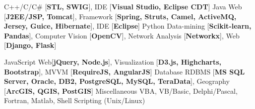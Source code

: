 \begin{cvskills}
    \cvskill
    {C++/C/C\#} %
    {[\textbf{STL, SWIG}], IDE [\textbf{Visual Studio, Eclipse CDT}]} 
    \cvskill
    {Java} %
    {Web [\textbf{J2EE/JSP, Tomcat}], Framework [\textbf{Spring, Struts, Camel, ActiveMQ, Jersey, Guice, Hibernate}], IDE [\textbf{Eclipse}]} 
    \cvskill
    {Python} 
    {Data-mining [\textbf{Scikit-learn, Pandas}], Computer Vision [\textbf{OpenCV}], Network Analysis [\textbf{Networkx}], Web [\textbf{Django, Flask}]} 

    \cvskill
    {JavaScript} 
    {Web[\textbf{jQuery, Node.js}], Visualization [\textbf{D3.js, Highcharts, Bootstrap}], MVVM [\textbf{RequireJS, AngularJS}]} 
    \cvskill
    {Database} 
    {RDBMS [\textbf{MS SQL Server, Oracle, DB2, PostgreSQL, MySQL,  TeraData}], Geography [\textbf{ArcGIS, QGIS, PostGIS}]}
    \cvskill
    {Miscellaneous} 
    {VBA, VB/Basic, Delphi/Pascal, Fortran, Matlab, Shell Scripting (Unix/Linux)}
\end{cvskills}
 



